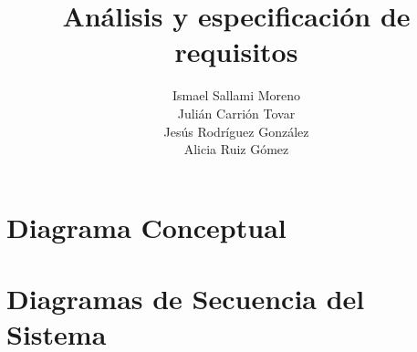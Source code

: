 \documentclass[twoside,openright,titlepage,numbers=noenddot,headinclude,footinclude=true,
cleardoublepage=empty,abstractoff,BCOR=5mm,paper=a4,fontsize=12pt,main=spanish,pdfstartpage=1]{scrreprt}
\author{Ismael Sallami Moreno \\ Julián Carrión Tovar \\ Jesús Rodríguez González \\ Alicia Ruiz Gómez}
\title{Análisis y especificación de requisitos}
\theoremstyle{plain}
\begin{document}
\maketitle


\onehalfspacing

\tableofcontents

\chapter{Diagrama Conceptual}

\chapter{Diagramas de Secuencia del Sistema}









%

\end{document}
